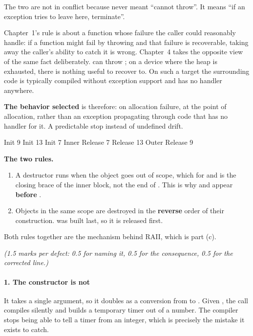 The two are not in conflict because  never meant ``cannot throw''. It means ``if an
exception tries to leave here, terminate''.

Chapter~1's rule is about a function whose failure the caller could reasonably handle: if a function
might fail by throwing and that failure is recoverable, taking away the caller's ability to catch it
is wrong. Chapter~4 takes the opposite view of the same fact deliberately. 
can throw ; on a device where the heap is exhausted, there is nothing useful to
recover to. On such a target the surrounding code is typically compiled without exception support
and has no handler anywhere. 

\textbf{The behavior selected} is therefore: on allocation failure,  at the
point of allocation, rather than an exception propagating through code that has no handler for it.
A predictable stop instead of undefined drift. 


\begin{console}
Init 9
Init 13
Init 7
Inner
Release 7
Release 13
Outer
Release 9
\end{console}

\textbf{The two rules.}
\begin{enumerate}
  \item A destructor runs when the object goes out of scope, which for  and
     is the closing brace of the inner block, not the end of . This is why
     and  appear \textbf{before} .
  \item Objects in the same scope are destroyed in the \textbf{reverse} order of their construction.
     was built last, so it is released first.
\end{enumerate}

Both rules together are the mechanism behind RAII, which is part (c).

\textit{(1.5 marks per defect: 0.5 for naming it, 0.5 for the consequence, 0.5 for the corrected
line.)}

\paragraph{1. The constructor is not }
It takes a single argument, so it doubles as a conversion from  to
. Given , the call  compiles
silently and builds a temporary timer out of a number. The compiler stops being able to tell a timer
from an integer, which is precisely the mistake it exists to catch.

